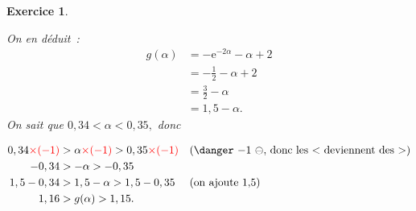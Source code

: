 \documentclass[10pt]{article}
\newtheorem{exo}{Exercice}
\begin{document}
\begin{exo}
\begin{enumerate}
\begin{enumerate}
 \medskip
 
 On en déduit~: \begin{align*}
 g(\alpha)&=-\text{e}^{-2\alpha}-\alpha+2
 \\&=-\frac{1}{2}-\alpha+2\\&=\frac{3}{2}-\alpha
 \\&=1,5-\alpha. 
 \end{align*}
 On sait que $0,34<\alpha<0,35,$ donc
 
  \begin{align*}
  0,34\textcolor{red}{\times (-1)}&>\alpha\textcolor{red}{\times (-1)}>0,35\textcolor{red}{\times (-1)}&&(\text{\danger $-1~\ominus,$ donc les $<$ deviennent des $>$})\\
  -0,34&>-\alpha>-0,35\\
 1,5-0,34&>1,5-\alpha>1,5-0,35&&(\text{on ajoute 1,5})\\
 1,16&>g(\alpha)>1,15.
 \end{align*}
 
 \end{enumerate}
 \end{enumerate}
 \end{exo}
 

 
 
 
\end{document}
